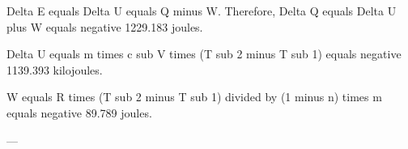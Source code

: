 Delta E equals Delta U equals Q minus W.  
Therefore, Delta Q equals Delta U plus W equals negative 1229.183 joules.  

Delta U equals m times c sub V times (T sub 2 minus T sub 1) equals negative 1139.393 kilojoules.  

W equals R times (T sub 2 minus T sub 1) divided by (1 minus n) times m equals negative 89.789 joules.  

---